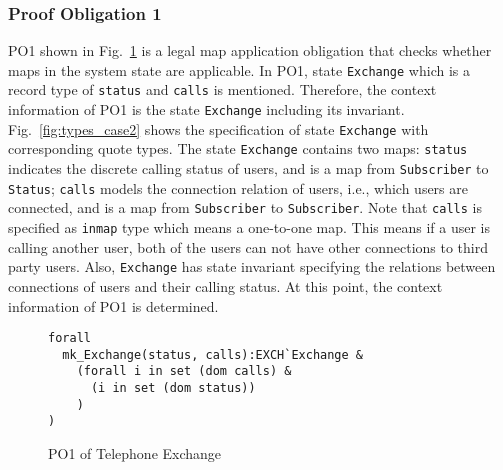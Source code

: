 \subsubsection{Proof Obligation 1}

PO1 shown in Fig.~\ref{fig:po1_case2} is a legal map application obligation that checks whether maps in the system state are applicable. In PO1, state {\tt Exchange} which is a record type of {\tt status} and {\tt calls} is mentioned. Therefore, the context information of PO1 is the state {\tt Exchange} including its invariant. Fig.~\ref{fig:types_case2} shows the specification of state {\tt Exchange} with corresponding quote types. The state {\tt Exchange} contains two maps: {\tt status} indicates the discrete calling status of users, and is a map from {\tt Subscriber} to {\tt Status}; {\tt calls} models the connection relation of users, i.e., which users are connected, and is a map from {\tt Subscriber} to {\tt Subscriber}. Note that {\tt calls} is specified as {\tt inmap} type which means a one-to-one map. This means if a user is calling another user, both of the users can not have other connections to third party users. Also, {\tt Exchange} has state invariant specifying the relations between connections of users and their calling status. At this point, the context information of PO1 is determined.

\begin{figure}[t]
\begin{center}
\begin{mdframed}[roundcorner=5pt]
\begin{Verbatim}[fontsize=\small]
forall
  mk_Exchange(status, calls):EXCH`Exchange &
    (forall i in set (dom calls) &
      (i in set (dom status))
    )
)
\end{Verbatim}
\end{mdframed}
\vspace{-10pt}
\caption{PO1 of Telephone Exchange}
\label{fig:po1_case2}
\end{center}
\vspace{-10pt}
\end{figure}


